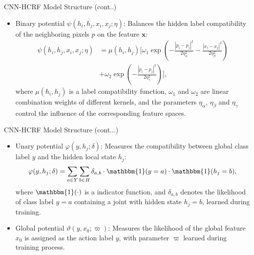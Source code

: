 \documentclass[leqno]{beamer}
\newcommand{\xb}{\mathbf{x}}
\newcommand{\one}{\mathbbm{1}}
\begin{document}
\begin{frame}{CNN-HCRF Model Structure (cont..)}
\begin{itemize}
\item Binary potential $\psi(h_i, h_j, x_i, x_j; \eta)$: Balances the hidden
label compatibility of the neighboring pixels $p$ on the feature $\xb$:
\begin{align*}
\psi(h_i, h_j, x_i, x_j; \eta) &= \mu(h_i, h_j) \Bigg[
\omega_1 \exp \left(
-\frac{\left\lvert p_i - p_j \right\rvert^2}{2\eta_\alpha^2}
-\frac{\left\lvert x_i - x_j \right\rvert^2}{2\eta_\beta^2}
\right) \\
&+ \omega_2 \exp \left(
- \frac{\left\lvert p_i - p_j \right\rvert^2}{2 \eta_\gamma^2}
\right)
\Bigg],
\end{align*}
where $\mu(h_i, h_j)$ is a label compatibility function,
$\omega_1$ and $\omega_2$ are linear combination weights of different kernels,
and the parameters $\eta_\alpha$, $\eta_\beta$ and $\eta_\gamma$ control the
influence of the corresponding feature spaces.
\end{itemize}
\end{frame}


\begin{frame}{CNN-HCRF Model Structure (cont...)}
\begin{itemize}
\item Unary potential $\varphi(y, h_{j}; \delta)$: Measures the compatibility
between global class label $y$ and the hidden local state $h_j$:
\begin{equation*}
\varphi(y, h_{j}; \delta) = \sum_{a \in Y} \sum_{b \in H} \delta_{a, b}
\cdot \one(y = a) \cdot \one(h_j = b),
\end{equation*}
where $\one(\cdot)$ is a indicator function, and $\delta_{a,b}$ denotes the
likelihood of class label $y = a$ containing a joint with hidden state
$h_j = b$, learned during training.
\item Global potential $\vartheta(y, x_0; \varpi)$: Measures the likelihood of
the global feature $x_0$ is assigned as the action label $y$, with parameter
$\varpi$ learned during training process.
\end{itemize}
\end{frame}
\end{document}
